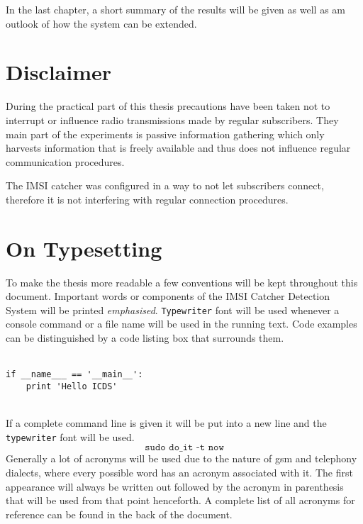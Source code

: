 In the last chapter, a short summary of the results will be given as well as am outlook of how the system can be extended.

\section{Disclaimer}
During the practical part of this thesis precautions have been taken not to interrupt or influence radio transmissions made by regular subscribers.
They main part of the experiments is passive information gathering which only harvests information that is freely available and thus does not influence regular communication procedures.

The IMSI catcher was configured in a way to not let subscribers connect, therefore it is not interfering with regular connection procedures.

\section{On Typesetting}
To make the thesis more readable a few conventions will be kept throughout this document.
Important words or components of the IMSI Catcher Detection System will be printed \emph{emphasised}.
\texttt{Typewriter} font will be used whenever a console command or a file name will be used in the running text.
Code examples can be distinguished by a code listing box that surrounds them.\\\\
\hspace*{\dimexpr\fboxsep+\fboxrule}%
\begin{minipage}{\dimexpr\textwidth-4\fboxsep-2\fboxrule} 
\begin{lstlisting} 
if __name___ == '__main__':
    print 'Hello ICDS'
\end{lstlisting} 
\end{minipage}\\
If a complete command line is given it will be put into a new line and the \texttt{typewriter} font will be used.
\[\texttt{sudo do\_it -t now}\]
Generally a lot of acronyms will be used due to the nature of \gls{gsm} and telephony dialects, where every possible word has an acronym associated with it.
The first appearance will always be written out followed by the acronym in parenthesis that will be used from that point henceforth.
A complete list of all acronyms for reference can be found in the back of the document.